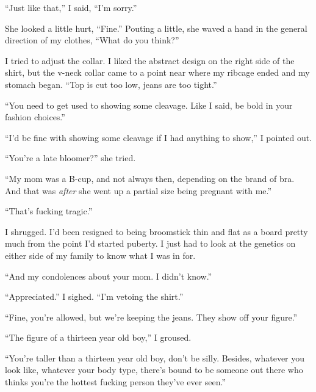 ``Just like that,'' I said, ``I'm sorry.''



She looked a little hurt, ``Fine.''  Pouting a little, she waved a hand in the general direction of my clothes, ``What do you think?''



I tried to adjust the collar.  I liked the abstract design on the right side of the shirt, but the v-neck collar came to a point near where my ribcage ended and my stomach began. ``Top is cut too low, jeans are too tight.''



``You need to get used to showing some cleavage.  Like I said, be bold in your fashion choices.''



``I'd be fine with showing some cleavage if I had anything to show,'' I pointed out.



``You're a late bloomer?'' she tried.



``My mom was a B-cup, and not always then, depending on the brand of bra.  And that was \emph{after} she went up a partial size being pregnant with me.''



``That's fucking tragic.''



I shrugged.  I'd been resigned to being broomstick thin and flat as a board pretty much from the point I'd started puberty.  I just had to look at the genetics on either side of my family to know what I was in for.



``And my condolences about your mom.  I didn't know.''



``Appreciated.''  I sighed. ``I'm vetoing the shirt.''



``Fine, you're allowed, but we're keeping the jeans.  They show off your figure.''



``The figure of a thirteen year old boy,'' I groused.



``You're taller than a thirteen year old boy, don't be silly.  Besides, whatever you look like, whatever your body type, there's bound to be someone out there who thinks you're the hottest fucking person they've ever seen.''



